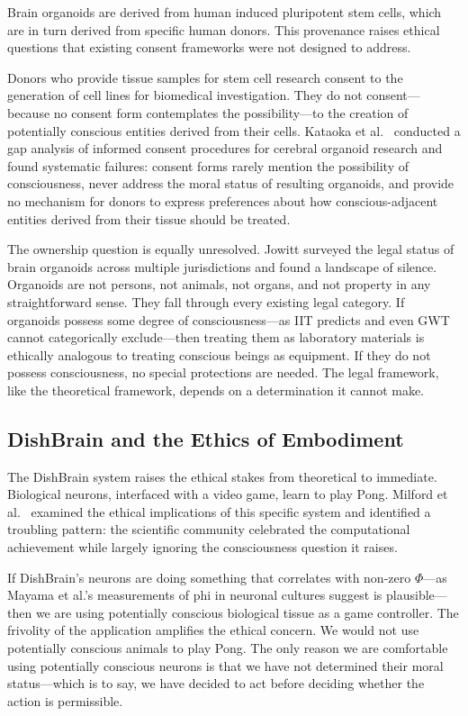 Brain organoids are derived from human induced pluripotent stem cells, which are in turn derived from specific human donors. This provenance raises ethical questions that existing consent frameworks were not designed to address.

Donors who provide tissue samples for stem cell research consent to the generation of cell lines for biomedical investigation. They do not consent---because no consent form contemplates the possibility---to the creation of potentially conscious entities derived from their cells. Kataoka et al.\ \cite{kataoka2023consent} conducted a gap analysis of informed consent procedures for cerebral organoid research and found systematic failures: consent forms rarely mention the possibility of consciousness, never address the moral status of resulting organoids, and provide no mechanism for donors to express preferences about how conscious-adjacent entities derived from their tissue should be treated.

The ownership question is equally unresolved. Jowitt \cite{jowitt2023legal} surveyed the legal status of brain organoids across multiple jurisdictions and found a landscape of silence. Organoids are not persons, not animals, not organs, and not property in any straightforward sense. They fall through every existing legal category. If organoids possess some degree of consciousness---as IIT predicts and even GWT cannot categorically exclude---then treating them as laboratory materials is ethically analogous to treating conscious beings as equipment. If they do not possess consciousness, no special protections are needed. The legal framework, like the theoretical framework, depends on a determination it cannot make.

\subsection{DishBrain and the Ethics of Embodiment}

The DishBrain system \cite{kagan2022dishbrain} raises the ethical stakes from theoretical to immediate. Biological neurons, interfaced with a video game, learn to play Pong. Milford et al.\ \cite{milford2023dishbrain} examined the ethical implications of this specific system and identified a troubling pattern: the scientific community celebrated the computational achievement while largely ignoring the consciousness question it raises.

If DishBrain's neurons are doing something that correlates with non-zero $\Phi$---as Mayama et al.'s \cite{mayama2025phi} measurements of phi in neuronal cultures suggest is plausible---then we are using potentially conscious biological tissue as a game controller. The frivolity of the application amplifies the ethical concern. We would not use potentially conscious animals to play Pong. The only reason we are comfortable using potentially conscious neurons is that we have not determined their moral status---which is to say, we have decided to act before deciding whether the action is permissible.

